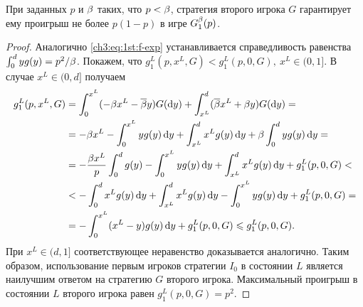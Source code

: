 {\begin{lemma}
  \label{ch3:lem:1st:upper-bound}
  При заданных $p$ и $\beta$ таких, что $p < \beta$, стратегия второго игрока $G$ гарантирует ему проигрыш не более $p(1-p)$ в игре $G^{\beta}_1(p)$.
\end{lemma}
\begin{proof}
  Аналогично \eqref{ch3:eq:1st:f-exp} устанавливается справедливость равенства $\int_0^d y g(y) = p^2/\beta$.
  Покажем, что $g^L_1(p, x^L, G) < g^L_1(p, 0, G),\ x^L \in (0, 1]$.
  В случае $x^L \in (0, d]$ получаем
  \begin{align*}
    g^L_1(p, x^L, G)
    &= \int_0^{x^L} (-\Co x^L - \DCo y) G(\di y) + \int_{x^L}^d(\DCo x^L + \Co y) G(\di y) = \\
    &= - \Co x^L - \int_0^{x^L} y g(y) \di y + \int_{x^L}^d x^L g(y) \di y + \Co \int_0^d y g(y) \di y = \\
    &= - \frac{\Co x^L}{p} \int_0^d g(y) - \int_0^{x^L} y g(y) \di y + \int_{x^L}^d x^L g(y) \di y + g^L_1(p, 0, G) < \\
    &< -\int_0^d x^L g(y) \di y + \int_{x^L}^d x^L g(y) \di y - \int_0^{x^L} y g(y) \di y + g^L_1(p, 0, G) = \\
    &= - \int_0^{x^L} (x^L - y) g(y) \di y + g^L_1(p, 0, G) \leq g^L_1(p, 0, G).
  \end{align*}
  При $x^L \in (d, 1]$ соответствующее неравенство доказывается аналогично.
  Таким образом, использование первым игроков стратегии $I_0$ в состоянии $L$ является наилучшим ответом на стратегию $G$ второго игрока.
  Максимальный проигрыш в состоянии $L$ второго игрока равен $g^L_1(p, 0, G) = p^2$.
  

\end{proof}}
